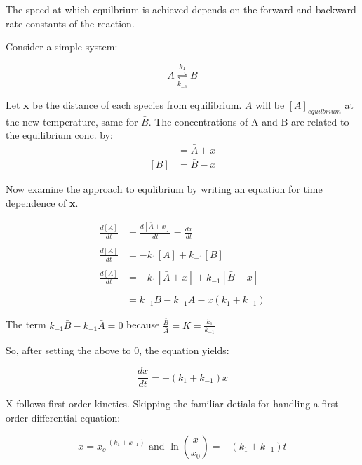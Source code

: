 \documentclass[12pt, letterpaper]{article}
\begin{document}
    The speed at which equilbrium is achieved depends on the forward and backward rate constants of the reaction. 

    Consider a simple system:

    \begin{equation*}
        A \stackrel{k_1}{\underset{k_{-1}}{\rightleftharpoons}} B
    \end{equation*}

    Let $\textbf{x}$ be the distance of each species from equilibrium. $\bar{A}$ will be $[A]_{equilbrium}$ at the new temperature, same for $\bar{B}$.
    The concentrations of A and B are related to the equilibrium conc. by: 
    \begin{align*}
        [A] &= \bar{A} + x \\
        [B] &= \bar{B} - x
    \end{align*}
    
    Now examine the approach to equlibrium by writing an equation for time dependence of \textbf{x}. 

    \begin{align*}
        \frac{d[A]}{dt} &= \frac{d[\bar{A} + x]}{dt} = \frac{dx}{dt} \\ \\ 
        \frac{d[A]}{dt} &= -k_1[A] + k_{-1}[B] \\ \\
        \frac{d[A]}{dt} &= -k_1[\bar{A} + x] + k_{-1}[\bar{B} - x] \\ \\
        &= k_{-1}\bar{B} - k_{-1}\bar{A} - x(k_1 + k_{-1})
    \end{align*}

    The term \(k_{-1}\bar{B} - k_{-1}\bar{A} = 0 \) because \( \frac{\bar{B}}{\bar{A}} = K = \frac{k_1}{k_{-1}} \)

    So, after setting the above to 0, the equation yields: 

    \begin{equation}
        \frac{dx}{dt} = -(k_1 + k_{-1})x
    \end{equation}

    X follows first order kinetics. Skipping the familiar detials for handling a first order differential equation: 

    \begin{equation}
        x = x_o^{-(k_1 + k_{-1})} \text{ and } \ln(\frac{x}{x_0}) = -(k_1 + k_{-1})t
    \end{equation}
\end{document}
